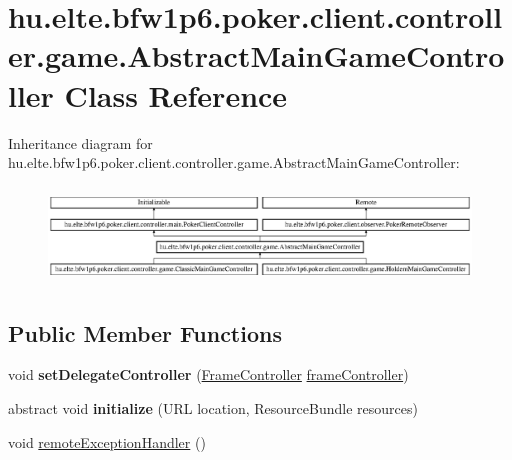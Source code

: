 \hypertarget{classhu_1_1elte_1_1bfw1p6_1_1poker_1_1client_1_1controller_1_1game_1_1_abstract_main_game_controller}{}\section{hu.\+elte.\+bfw1p6.\+poker.\+client.\+controller.\+game.\+Abstract\+Main\+Game\+Controller Class Reference}
\label{classhu_1_1elte_1_1bfw1p6_1_1poker_1_1client_1_1controller_1_1game_1_1_abstract_main_game_controller}
Inheritance diagram for hu.\+elte.\+bfw1p6.\+poker.\+client.\+controller.\+game.\+Abstract\+Main\+Game\+Controller\+:\begin{figure}[H]
\begin{center}
\leavevmode
\includegraphics[height=2.592592cm]{classhu_1_1elte_1_1bfw1p6_1_1poker_1_1client_1_1controller_1_1game_1_1_abstract_main_game_controller}
\end{center}
\end{figure}
\subsection*{Public Member Functions}
\begin{DoxyCompactItemize}
\item 
\hypertarget{classhu_1_1elte_1_1bfw1p6_1_1poker_1_1client_1_1controller_1_1game_1_1_abstract_main_game_controller_a7aa6f4807b08c3cb8cd46a01db5f3a71}{}void {\bfseries set\+Delegate\+Controller} (\hyperlink{classhu_1_1elte_1_1bfw1p6_1_1poker_1_1client_1_1controller_1_1main_1_1_frame_controller}{Frame\+Controller} \hyperlink{classhu_1_1elte_1_1bfw1p6_1_1poker_1_1client_1_1controller_1_1game_1_1_abstract_main_game_controller_afd5cf3cc6b129ebb7a3a161a3ea07fe4}{frame\+Controller})\label{classhu_1_1elte_1_1bfw1p6_1_1poker_1_1client_1_1controller_1_1game_1_1_abstract_main_game_controller_a7aa6f4807b08c3cb8cd46a01db5f3a71}

\item 
\hypertarget{classhu_1_1elte_1_1bfw1p6_1_1poker_1_1client_1_1controller_1_1game_1_1_abstract_main_game_controller_aa1a627df3ab65904c70a9234597e7589}{}abstract void {\bfseries initialize} (U\+R\+L location, Resource\+Bundle resources)\label{classhu_1_1elte_1_1bfw1p6_1_1poker_1_1client_1_1controller_1_1game_1_1_abstract_main_game_controller_aa1a627df3ab65904c70a9234597e7589}

\item 
void \hyperlink{classhu_1_1elte_1_1bfw1p6_1_1poker_1_1client_1_1controller_1_1game_1_1_abstract_main_game_controller_adb576c1bbf4127195476c930e23285db}{remote\+Exception\+Handler} ()
\end{DoxyCompactItemize}
